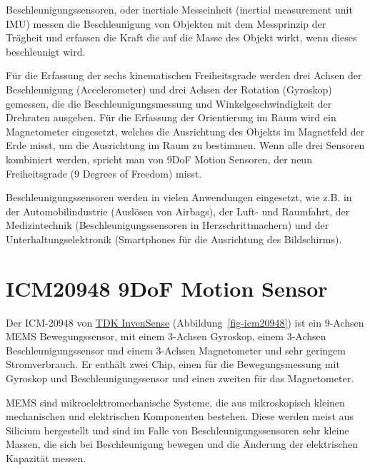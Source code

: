 \documentclass[
  11pt,
  a4paper,
  oneside, openany  ,captions=tableheading
]{scrbook}
\theoremstyle{remark}
\renewcommand{\markright}[1]{\def\chaptertitle{#1}} %
\begin{document}
\markright{Beschleunigungssensoren IMU}

Beschleunigungssensoren, oder inertiale Messeinheit (inertial
measurement unit IMU) messen die Beschleunigung von Objekten mit dem
Messprinzip der Trägheit und erfassen die Kraft die auf die Masse des
Objekt wirkt, wenn dieses beschleunigt wird.

Für die Erfassung der sechs kinematischen Freiheitsgrade werden drei
Achsen der Beschleunigung (Accelerometer) und drei Achsen der Rotation
(Gyroskop) gemessen, die die Beschleunigungsmessung und
Winkelgeschwindigkeit der Drehraten ausgeben. Für die Erfassung der
Orientierung im Raum wird ein Magnetometer eingesetzt, welches die
Ausrichtung des Objekts im Magnetfeld der Erde misst, um die Ausrichtung
im Raum zu bestimmen. Wenn alle drei Sensoren kombiniert werden, spricht
man von 9DoF Motion Sensoren, der neun Freiheitsgrade (9 Degrees of
Freedom) misst.

Beschleunigungssensoren werden in vielen Anwendungen eingesetzt, wie
z.B. in der Automobilindustrie (Auslösen von Airbags), der Luft- und
Raumfahrt, der Medizintechnik (Beschleunigungssensoren in
Herzschrittmachern) und der Unterhaltungselektronik (Smartphones für die
Ausrichtung des Bildschirms).

\section*{\texorpdfstring{ICM20948 9DoF Motion
Sensor}{ICM20948 9DoF Motion Sensor}}\label{icm20948-9dof-motion-sensor}

\markright{ICM20948 9DoF Motion Sensor\index{ICM20948}}

Der ICM-20948 von
\href{https://invensense.tdk.com/products/motion-tracking/9-axis/icm-20948}{TDK
InvenSense} (Abbildung~\ref{fig-icm20948}) ist ein 9-Achsen MEMS
Bewegungssensor, mit einem 3-Achsen Gyroskop, einem 3-Achsen
Beschleunigungssensor und einem 3-Achsen Magnetometer und sehr geringem
Stromverbrauch. Er enthält zwei Chip, einen für die Bewegungsmessung mit
Gyroskop und Beschleunigungssensor und einen zweiten für das
Magnetometer.

MEMS sind mikroelektromechanische Systeme, die aus
mikroskopisch kleinen mechanischen und elektrischen Komponenten
bestehen. Diese werden meist aus Silicium hergestellt und sind im Falle
von Beschleunigungssensoren sehr kleine Massen, die sich bei
Beschleunigung bewegen und die Änderung der elektrischen Kapazität
messen.
\end{document}
